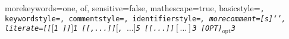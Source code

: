   {
    morekeywords={one, of},
    sensitive=false,
    mathescape=true,
    basicstyle=\footnotesize\tt,
    keywordstyle=\footnotesize\tt,
    commentstyle=\footnotesize\tt,
    identifierstyle=\footnotesize\it,
    morecomment=[s]{`}{'},
    literate={[[}{{$[$}}{1}
             {]]}{{$]$}}{1}
             {[[,...]]}{{$[$, $\ldots]$}}{5}
             {[[...]]}{{$[\ldots]$}}{3}
             {[OPT]}{{$_{\mbox{opt}}$}}{3}
  }


\newcommand{\sntx}[1]{\lstinline[language=syntax,basicstyle=\normalsize\tt,identifierstyle=\normalsize\it]!#1!}
